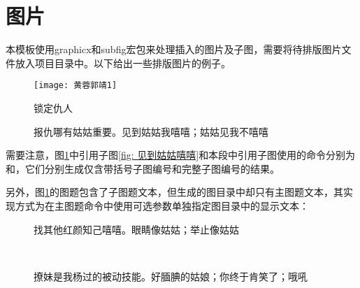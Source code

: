 \documentclass[print, promaster, vlined]{DissertUESTC}
\begin{document}
	\section{图片}
	
	本模板使用graphicx和subfig宏包来处理插入的图片及子图，需要将待排版图片文件放入项目目录中。以下给出一些排版图片的例子。
	
	\begin{figure}[!htb]
		\centering
		\texttt{[image: 黄蓉郭靖1]}
		\caption{锁定仇人}
	\end{figure}
	
	\clearpage
	\begin{figure}[!htb]
		\centering
		\hfill
		\caption[报仇哪有姑姑重要]{报仇哪有姑姑重要。见到姑姑我嘻嘻；姑姑见我不嘻嘻} \label{fig: 报仇哪有姑姑重要}
	\end{figure}
	

	需要注意，图\ref{fig: 报仇哪有姑姑重要}中引用子图\ref{fig: 见到姑姑嘻嘻}和本段中引用子图使用的命令分别为和，它们分别生成仅含带括号子图编号和完整子图编号的结果。
	
	另外，图\ref{fig: 报仇哪有姑姑重要}的图题包含了子图题文本，但生成的图目录中却只有主图题文本，其实现方式为在主图题命令中使用可选参数单独指定图目录中的显示文本：
	
	\begin{figure}[!htb]
		\centering
		\hfill
		\subfloat[]{
			\texttt{[image: 程英3]}
			\label{fig: 程英3}
		}
		\caption{找其他红颜知己嘻嘻。眼睛像姑姑；举止像姑姑} \label{fig: 红颜知己}
	\end{figure}
	
	\begin{figure}[!htb]
		\centering
		\subfloat[]{
			\texttt{[image: 绿萼2]}
			\label{fig: 绿萼2}
		}
		\hfill
		\\
		\caption{撩妹是我杨过的被动技能。好腼腆的姑娘；你终于肯笑了；哦吼} \label{fig: 被动技能}
	\end{figure}
\end{document}
